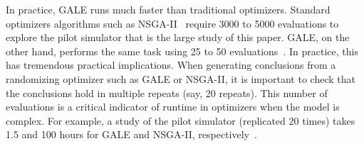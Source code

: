 \documentclass[journal]{IEEEtran}
\begin{document}
In practice, GALE runs much faster than traditional optimizers. 
Standard optimizers algorithms such as NSGA-II~\cite{deb00afast} require 3000 to 5000 evaluations to explore the pilot
simulator that is the large
study of this paper. 
GALE, on the other hand, performs the same task using 25 to 50 evaluations~\cite{krallphd}.
In practice, this has tremendous practical implications.
When generating conclusions from a randomizing optimizer such as GALE or NSGA-II, it is important to check that the conclusions hold in multiple repeats (say, 20 repeats). 
This number of evaluations is a critical indicator of runtime in optimizers when the model is complex.
For example, a study of the pilot simulator (replicated 20 times)
takes 1.5 and 100 hours for GALE and NSGA-II, respectively~\cite{krallphd}.
\end{document}

